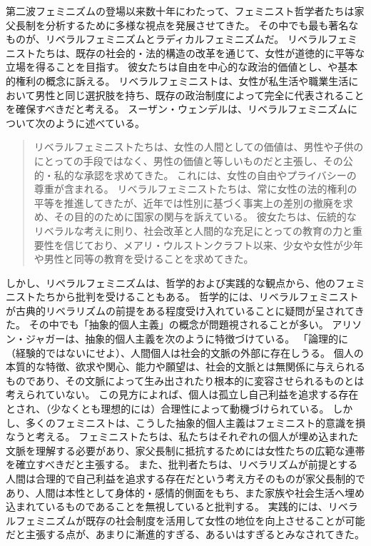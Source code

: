 \documentclass[paper=a4,book,openany]{jlreq} \usepackage{mystyle}
\begin{document}
第二波フェミニズムの登場以来数十年にわたって、フェミニスト哲学者たちは家父長制を分析するために多様な視点を発展させてきた。
その中でも最も著名なものが、リベラルフェミニズムとラディカルフェミニズムだ。
リベラルフェミニストたちは、既存の社会的・法的構造の改革を通じて、女性が道徳的に平等な立場を得ることを目指す。
彼女たちは自由を中心的な政治的価値とし、や基本的権利の概念に訴える。
リベラルフェミニストは、女性が私生活や職業生活において男性と同じ選択肢を持ち、既存の政治制度によって完全に代表されることを確保すべきだと考える。
スーザン・ウェンデルは、リベラルフェミニズムについて次のように述べている。

\begin{quote}
リベラルフェミニストたちは、女性の人間としての価値は、男性や子供のにとっての手段ではなく、男性の価値と等しいものだと主張し、その公的・私的な承認を求めてきた。
これには、女性の自由やプライバシーの尊重が含まれる。
リベラルフェミニストたちは、常に女性の法的権利の平等を推進してきたが、近年では性別に基づく事実上の差別の撤廃を求め、その目的のために国家の関与を訴えている。
彼女たちは、伝統的なリベラルな考えに則り、社会改革と人間的な充足にとっての教育の力と重要性を信じており、メアリ・ウルストンクラフト以来、少女や女性が少年や男性と同等の教育を受けることを求めてきた。
\citep[p.66]{wendell87:_qualif_defen_liber_femin}
\end{quote}

しかし、リベラルフェミニズムは、哲学的および実践的な観点から、他のフェミニストたちから批判を受けることもある。
哲学的には、リベラルフェミニストが古典的リベラリズムの前提をある程度受け入れていることに疑問が呈されてきた。
その中でも「抽象的個人主義」の概念が問題視されることが多い。
アリソン・ジャガーは、抽象的個人主義を次のように特徴づけている。
「論理的に（経験的ではないにせよ）、人間個人は社会的文脈の外部に存在しうる。
個人の本質的な特徴、欲求や関心、能力や願望は、社会的文脈とは無関係に与えられるものであり、その文脈によって生み出されたり根本的に変容させられるものとは考えられていない\citep[pp.28-29]{jaggar83:_femin_polit_human_natur}。
この見方によれば、個人は孤立し自己利益を追求する存在とされ、（少なくとも理想的には）合理性によって動機づけられている。
しかし、多くのフェミニストは、こうした抽象的個人主義はフェミニスト的意識を損なうと考える。
フェミニストたちは、私たちはそれぞれの個人が埋め込まれた文脈を理解する必要があり、家父長制に抵抗するためには女性たちの広範な連帯を確立すべきだと主張する。
また、批判者たちは、リベラリズムが前提とする人間は合理的で自己利益を追求する存在だという考え方そのものが家父長制的であり、人間は本性として身体的・感情的側面をもち、また家族や社会生活へ埋め込まれているものであることを無視していると批判する。
実践的には、リベラルフェミニズムが既存の社会制度を活用して女性の地位を向上させることが可能だと主張する点が、あまりに漸進的すぎる、あるいはすぎるとみなされてきた。
\end{document}
